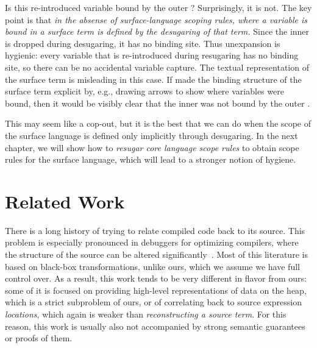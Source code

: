 Is this re-introduced variable bound by the outer ?
Surprisingly, it is not. The key point is that \emph{in the absense of
  surface-language scoping rules, where a variable is bound in a
  surface term is defined by the desugaring of that term.}
Since the inner  is dropped during desugaring, it has no
binding site. Thus unexpansion is hygienic: every variable that is
re-introduced during resugaring has no binding site, so there can be
no accidental variable capture. The textual representation of the
surface term is misleading in this case. If {\Resugarer} made the
binding structure of the surface term explicit by, e.g., drawing
arrows to show where variables were bound, then it would be visibly
clear that the inner  was not bound by the outer .

This may seem like a cop-out, but it is the best that we can do when
the scope of the surface language is defined only implicitly through
desugaring. In the next chapter, we will show how to \emph{resugar
  core language scope rules} to obtain scope rules for the surface
language, which will lead to a stronger notion of hygiene.


\section{Related Work}

There is a long history of trying to relate compiled code back to its
source. This problem is especially pronounced in debuggers for
optimizing compilers, where the structure of the source can be altered
significantly~\cite{hennessy-debugging}. Most of this literature
is based on black-box
transformations, unlike ours, which we assume we have full control
over.  As a result, this work tends to be very different in flavor
from ours: some of it is focused on providing high-level
representations of data on the heap, which is a strict subproblem of
ours, or of correlating back to source expression \emph{locations}, which
again is weaker than \emph{reconstructing a source term}.
For this reason,
this work is usually also not accompanied by strong semantic
guarantees or proofs of them.

